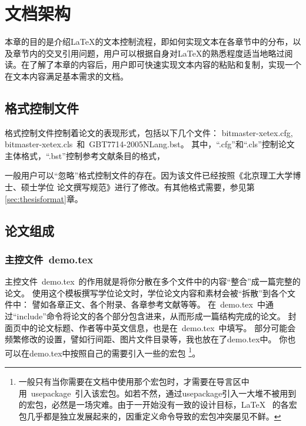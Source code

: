 
\chapter{文档架构}
\label{chap:textStructure}

本章的目的是介绍\LaTeX{}的文本控制流程，即如何实现文本在各章节中的分布，以及章节内的交叉引用问题，用户可以根据自身对\LaTeX{}的熟悉程度适当地略过阅读。在了解了本章的内容后，用户即可快速实现文本内容的粘贴和复制，实现一个在文本内容满足基本需求的文档。

\section{格式控制文件}
\label{sec:format}

格式控制文件控制着论文的表现形式，包括以下几个文件：
bitmaster-xetex.cfg, bitmaster-xetex.cls~和~GBT7714-2005NLang.bst。
其中，``.cfg''和``.cls''控制论文主体格式，``.bst''控制参考文献条目的格式，

一般用户可以``忽略''格式控制文件的存在。因为该文件已经按照《北京理工大学博士、硕士学位
论文撰写规范》进行了修改。有其他格式需要，参见第\ref{sec:thesisformat}章。

\section{论文组成}

\subsection{主控文件~demo.tex}
\label{sec:demotex}

主控文件~demo.tex~的作用就是将你分散在多个文件中的内容``整合''成一篇完整的论文。
使用这个模板撰写学位论文时，学位论文内容和素材会被``拆散''到各个文件中：
譬如各章正文、各个附录、各章参考文献等等。
在~demo.tex~中通过``include''命令将论文的各个部分包含进来，从而形成一篇结构完成的论文。
封面页中的论文标题、作者等中英文信息，也是在~demo.tex~中填写。
部分可能会频繁修改的设置，譬如行间距、图片文件目录等，我也放在了demo.tex中。
你也可以在demo.tex中按照自己的需要引入一些的宏包
\footnote{一般只有当你需要在文档中使用那个宏包时，才需要在导言区中用~usepackage~引入该宏包。如若不然，通过usepackage引入一大堆不被用到的宏包，必然是一场灾难。由于一开始没有一致的设计目标，\LaTeX~ 的各宏包几乎都是独立发展起来的，因重定义命令导致的宏包冲突屡见不鲜。}。

